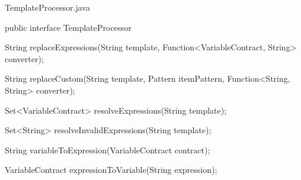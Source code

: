 \begin{program}[h]
\caption{TemplateProcessor.java}
\label{prog:templateProcessor}
\begin{JavaCode}
public interface TemplateProcessor {

    String replaceExpressions(String template,
                              Function<VariableContract, String> converter);

    String replaceCustom(String template,
                         Pattern itemPattern,
                         Function<String, String> converter);

    Set<VariableContract> resolveExpressions(String template);

    Set<String> resolveInvalidExpressions(String template);

    String variableToExpression(VariableContract contract);

    VariableContract expressionToVariable(String expression);
}
\end{JavaCode}
\end{program}

